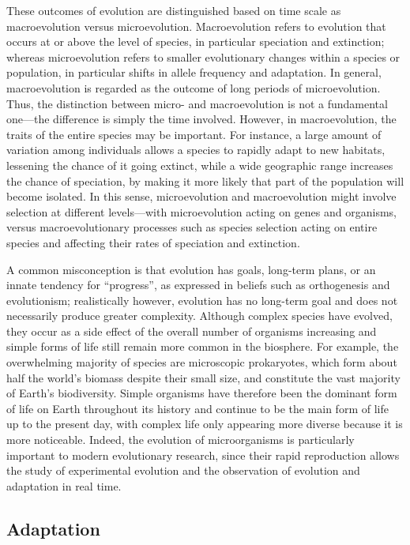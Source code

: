 These outcomes of evolution are distinguished based on time scale as macroevolution versus microevolution. Macroevolution refers to evolution that occurs at or above the level of species, in particular speciation and extinction; whereas microevolution refers to smaller evolutionary changes within a species or population, in particular shifts in allele frequency and adaptation. In general, macroevolution is regarded as the outcome of long periods of microevolution. Thus, the distinction between micro- and macroevolution is not a fundamental one---the difference is simply the time involved. However, in macroevolution, the traits of the entire species may be important. For instance, a large amount of variation among individuals allows a species to rapidly adapt to new habitats, lessening the chance of it going extinct, while a wide geographic range increases the chance of speciation, by making it more likely that part of the population will become isolated. In this sense, microevolution and macroevolution might involve selection at different levels---with microevolution acting on genes and organisms, versus macroevolutionary processes such as species selection acting on entire species and affecting their rates of speciation and extinction.

A common misconception is that evolution has goals, long-term plans, or an innate tendency for ``progress'', as expressed in beliefs such as orthogenesis and evolutionism; realistically however, evolution has no long-term goal and does not necessarily produce greater complexity. Although complex species have evolved, they occur as a side effect of the overall number of organisms increasing and simple forms of life still remain more common in the biosphere. For example, the overwhelming majority of species are microscopic prokaryotes, which form about half the world's biomass despite their small size, and constitute the vast majority of Earth's biodiversity. Simple organisms have therefore been the dominant form of life on Earth throughout its history and continue to be the main form of life up to the present day, with complex life only appearing more diverse because it is more noticeable. Indeed, the evolution of microorganisms is particularly important to modern evolutionary research, since their rapid reproduction allows the study of experimental evolution and the observation of evolution and adaptation in real time.

\hypertarget{adaptation}{%
\subsection{Adaptation}\label{adaptation}}

